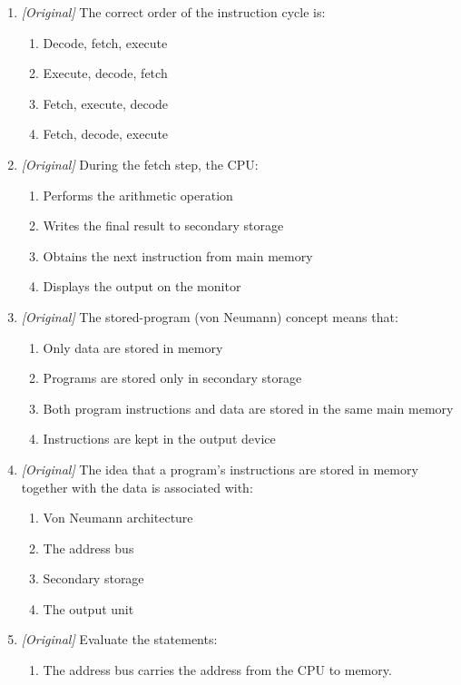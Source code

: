 \documentclass[11pt]{article}
\begin{document}
\begin{enumerate}[label=\textbf{Q\arabic*.}, leftmargin=*]
\begin{enumerate}[label=\Alph*.]
  \end{enumerate}
\item \textit{[Original]} The correct order of the instruction cycle is:
  \begin{enumerate}[label=\Alph*.]
    \item Decode, fetch, execute
    \item Execute, decode, fetch
    \item Fetch, execute, decode
    \item Fetch, decode, execute
  \end{enumerate}
\item \textit{[Original]} During the fetch step, the CPU:
  \begin{enumerate}[label=\Alph*.]
    \item Performs the arithmetic operation
    \item Writes the final result to secondary storage
    \item Obtains the next instruction from main memory
    \item Displays the output on the monitor
  \end{enumerate}
\item \textit{[Original]} The stored-program (von Neumann) concept means
  that:
  \begin{enumerate}[label=\Alph*.]
    \item Only data are stored in memory
    \item Programs are stored only in secondary storage
    \item Both program instructions and data are stored in the same main
      memory
    \item Instructions are kept in the output device
  \end{enumerate}
\item \textit{[Original]} The idea that a program's instructions are stored
  in memory together with the data is associated with:
  \begin{enumerate}[label=\Alph*.]
    \item Von Neumann architecture
    \item The address bus
    \item Secondary storage
    \item The output unit
  \end{enumerate}
\item \textit{[Original]} Evaluate the statements:
  \begin{enumerate}[label=\Roman*.]
    \item The address bus carries the address from the CPU to memory.

\end{enumerate}
\end{enumerate}
\end{document}
